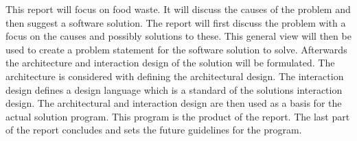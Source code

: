 This report will focus on food waste. It will discuss the causes of the problem and then suggest a software solution. The report will first discuss the problem with a focus on the causes and possibly solutions to these. This general view will then be used to create a problem statement for the software solution to solve. Afterwards the architecture and interaction design of the solution will be formulated. The architecture is considered with defining the architectural design. The interaction design defines a design language which is a standard of the solutions interaction design. The architectural and interaction design are then used as a basis for the actual solution program. This program is the product of the report. The last part of the report concludes and sets the future guidelines for the program.  
